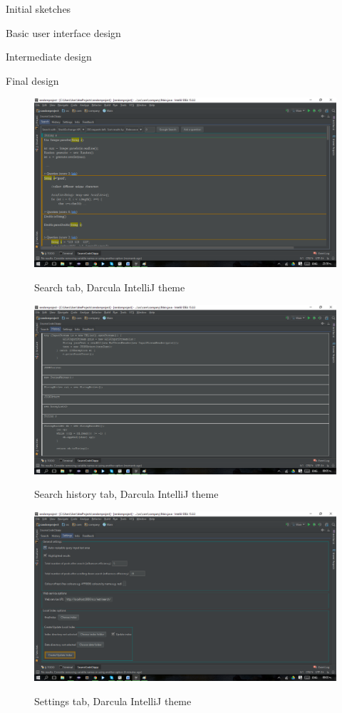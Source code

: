 \documentclass{l4proj}
\begin{document}
Initial sketches

Basic user interface design

Intermediate design

Final design
\begin{figure}[h]
\caption{Search tab, Darcula IntelliJ theme}
\includegraphics[scale=0.2]{tab-search}
\centering
\label{fig:search-tab}
\end{figure}

\begin{figure}[h]
\caption{Search history tab, Darcula IntelliJ theme}
\includegraphics[scale=0.2]{tab-history}
\centering
\label{fig:history-tab}
\end{figure}

\begin{figure}[h]
\caption{Settings tab, Darcula IntelliJ theme}
\includegraphics[scale=0.2]{tab-settings}
\centering
\label{fig:settings-tab}
\end{figure}
\end{document}
